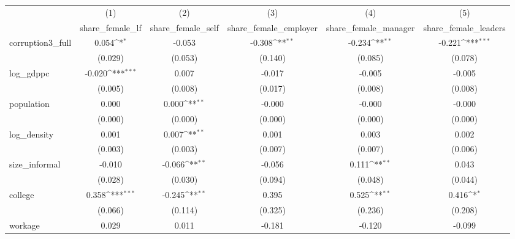 {
\def\sym#1{\ifmmode^{#1}\else\(^{#1}\)\fi}
\begin{tabular}{l*{5}{c}}
\hline\hline
            &\multicolumn{1}{c}{(1)}&\multicolumn{1}{c}{(2)}&\multicolumn{1}{c}{(3)}&\multicolumn{1}{c}{(4)}&\multicolumn{1}{c}{(5)}\\
            &\multicolumn{1}{c}{share\_female\_lf}&\multicolumn{1}{c}{share\_female\_self}&\multicolumn{1}{c}{share\_female\_employer}&\multicolumn{1}{c}{share\_female\_manager}&\multicolumn{1}{c}{share\_female\_leaders}\\
\hline
corruption3\_full&       0.054\sym{*}  &      -0.053         &      -0.308\sym{**} &      -0.234\sym{**} &      -0.221\sym{***}\\
            &     (0.029)         &     (0.053)         &     (0.140)         &     (0.085)         &     (0.078)         \\
[1em]
log\_gdppc   &      -0.020\sym{***}&       0.007         &      -0.017         &      -0.005         &      -0.005         \\
            &     (0.005)         &     (0.008)         &     (0.017)         &     (0.008)         &     (0.008)         \\
[1em]
population  &       0.000         &       0.000\sym{**} &      -0.000         &      -0.000         &      -0.000         \\
            &     (0.000)         &     (0.000)         &     (0.000)         &     (0.000)         &     (0.000)         \\
[1em]
log\_density &       0.001         &       0.007\sym{**} &       0.001         &       0.003         &       0.002         \\
            &     (0.003)         &     (0.003)         &     (0.007)         &     (0.007)         &     (0.006)         \\
[1em]
size\_informal&      -0.010         &      -0.066\sym{**} &      -0.056         &       0.111\sym{**} &       0.043         \\
            &     (0.028)         &     (0.030)         &     (0.094)         &     (0.048)         &     (0.044)         \\
[1em]
college     &       0.358\sym{***}&      -0.245\sym{**} &       0.395         &       0.525\sym{**} &       0.416\sym{*}  \\
            &     (0.066)         &     (0.114)         &     (0.325)         &     (0.236)         &     (0.208)         \\
[1em]
workage     &       0.029         &       0.011         &      -0.181         &      -0.120         &      -0.099         \\

\end{tabular}}
